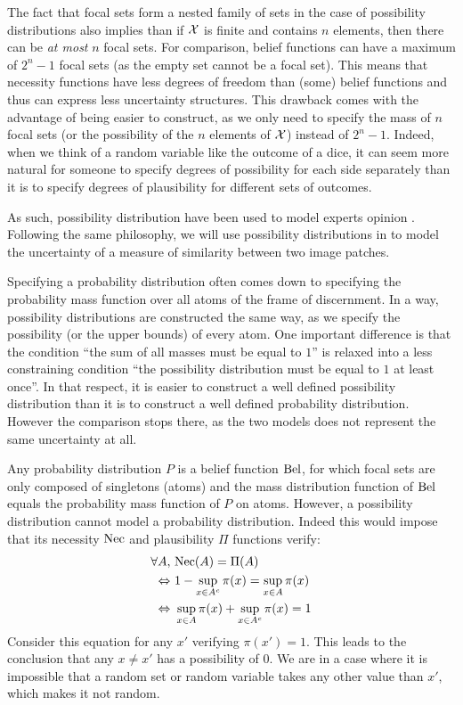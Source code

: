 \begin{remark}
    The fact that focal sets form a nested family of sets in the case of possibility distributions also implies than if $\mathcal{X}$ is finite and contains $n$ elements, then there can be \textit{at most} $n$ focal sets. For comparison, belief functions can have a maximum of $2^n-1$ focal sets (as the empty set cannot be a focal set). This means that necessity functions have less degrees of freedom than (some) belief functions and thus can express less uncertainty structures. This drawback comes with the advantage of being easier to construct, as we only need to specify the mass of $n$ focal sets (or the possibility of the $n$ elements of $\mathcal{X}$) instead of $2^n-1$. Indeed, when we think of a random variable like the outcome of a dice, it can seem more natural for someone to specify degrees of possibility for each side separately than it is to specify degrees of plausibility for different sets of outcomes. 
    
    As such, possibility distribution have been used to model experts opinion  \cite{baudrit_joint_2007}. Following the same philosophy, we will use possibility distributions in  to model the uncertainty of a measure of similarity between two image patches.
\end{remark}

Specifying a probability distribution often comes down to specifying the probability mass function over all atoms of the frame of discernment. In a way, possibility distributions are constructed the same way, as we specify the possibility (or the upper bounds) of every atom. One important difference is that the condition ``the sum of all masses must be equal to $1$'' is relaxed into a less constraining condition ``the possibility distribution must be equal to $1$ at least once''. In that respect, it is easier to construct a well defined possibility distribution than it is to construct a well defined probability distribution. However the comparison stops there, as the two models does not represent the same uncertainty at all.

\begin{remark}
    Any probability distribution $P$ is a belief function $\mathrm{Bel}$, for which focal sets are only composed of singletons (atoms) and the mass distribution function of $\mathrm{Bel}$ equals the probability mass function of $P$ on atoms. However, a possibility distribution cannot model a probability distribution. Indeed this would impose that its necessity $\mathrm{Nec}$ and plausibility $\Pi$ functions verify:
    \begin{align*}
        \forall A, &~\mathrm{Nec}(A) = \Pi(A)\\
        \Leftrightarrow&~1-\sup_{x\in A^c}\pi(x) = \sup_{x\in A}\pi(x)\\
        \Leftrightarrow&~ \sup_{x\in A}\pi(x) + \sup_{x\in A^c}\pi(x) = 1
    \end{align*}
    Consider this equation for any $x'$ verifying $\pi(x')=1$. This leads to the conclusion that any $x\neq x'$ has a possibility of $0$. We are in a case where it is impossible that a random set or random variable takes any other value than $x'$, which makes it not random. 
\end{remark}

